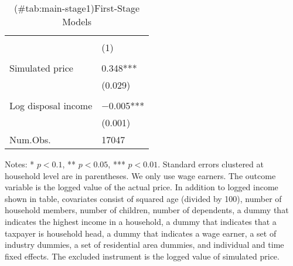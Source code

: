 \begin{table}

\caption{(\#tab:main-stage1)First-Stage Models}
\centering
\fontsize{8}{10}\selectfont
\begin{threeparttable}
\begin{tabular}[t]{l>{\centering\arraybackslash}p{18.75em}}
\toprule
\multicolumn{1}{c}{ } & \multicolumn{1}{c}{Actual price} \\
\cmidrule(l{3pt}r{3pt}){2-2}
  & (1)\\
\midrule
\addlinespace[0.3em]
\multicolumn{2}{l}{\textit{Excluded instruments}}\\
\hspace{1em}Simulated price & \num{0.348}***\\
\hspace{1em} & (\num{0.029})\\
\addlinespace[0.3em]
\multicolumn{2}{l}{\textit{Covariates}}\\
\hspace{1em}Log disposal income & \num{-0.005}***\\
\hspace{1em} & (\num{0.001})\\
\midrule
Num.Obs. & \num{17047}\\
\bottomrule
\end{tabular}
\begin{tablenotes}
\item Notes: * $p < 0.1$, ** $p < 0.05$, *** $p < 0.01$. Standard errors clustered at household level are in parentheses. We only use wage earners. The outcome variable is the logged value of the actual price. In addition to logged income shown in table, covariates consist of squared age (divided by 100), number of household members, number of children, number of dependents, a dummy that indicates the highest income in a household, a dummy that indicates that a taxpayer is household head, a dummy that indicates a wage earner, a set of industry dummies, a set of residential area dummies, and individual and time fixed effects. The excluded instrument is the logged value of simulated price.
\end{tablenotes}
\end{threeparttable}
\end{table}
